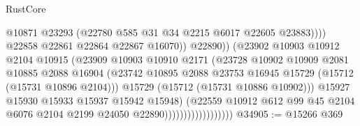 \begin{lexlean}{RustCore}
\begin{coremodule}
                                                  @10871
                                                  @23293
                                                  (@22780 @585 @31 @34 @2215 @6017 @22605 @23883))))
                                            @22858
                                            @22861
                                            @22864
                                            @22867
                                            @16070))
                                        @22890))
                                    (@23902
                                      @10903
                                      @10912
                                      @2104
                                      @10915
                                      (@23909
                                        @10903
                                        @10910
                                        @2171
                                        (@23728
                                          @10902
                                          @10909
                                          @2081
                                          @10885
                                          @2088
                                          @16904
                                          (@23742
                                            @10895
                                            @2088
                                            @23753
                                            @16945
                                            @15729
                                            (@15712 (@15731 @10896 @2104)))
                                          @15729
                                          (@15712 (@15731 @10886 @10902)))
                                        @15927
                                        @15930
                                        @15933
                                        @15937
                                        @15942
                                        @15948)
                                      (@22559
                                        @10912
                                        @612
                                        @99
                                        @45
                                        @2104
                                        @6076
                                        @2104
                                        @2199
                                        @24050
                                        @22890))))))))))))))))))
@34905 := @15266 @369

\end{coremodule}
\end{lexlean}
